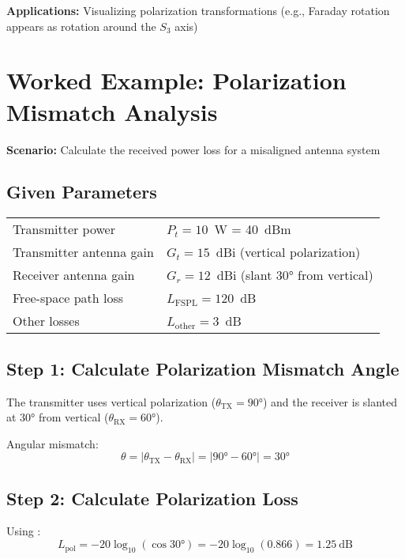 \begin{center}
\textbf{Applications:} Visualizing polarization transformations (e.g., Faraday rotation appears as rotation around the $S_3$ axis)

\section{Worked Example: Polarization Mismatch Analysis}

\textbf{Scenario:} Calculate the received power loss for a misaligned antenna system

\subsection*{Given Parameters}

\noindent
\begin{tabular}{@{}ll@{}}
Transmitter power & $P_t = 10$~W = 40~dBm \\
Transmitter antenna gain & $G_t = 15$~dBi (vertical polarization) \\
Receiver antenna gain & $G_r = 12$~dBi (slant $30°$ from vertical) \\
Free-space path loss & $L_{\text{FSPL}} = 120$~dB \\
Other losses & $L_{\text{other}} = 3$~dB \\
\end{tabular}

\subsection*{Step 1: Calculate Polarization Mismatch Angle}

The transmitter uses vertical polarization ($\theta_{\text{TX}} = 90°$) and the receiver is slanted at $30°$ from vertical ($\theta_{\text{RX}} = 60°$).

Angular mismatch:
\begin{equation}
\theta = |\theta_{\text{TX}} - \theta_{\text{RX}}| = |90° - 60°| = 30°
\end{equation}

\subsection*{Step 2: Calculate Polarization Loss}

Using :
\begin{equation}
L_{\text{pol}} = -20\log_{10}(\cos 30°) = -20\log_{10}(0.866) = 1.25~\text{dB}
\end{equation}


\end{center}
